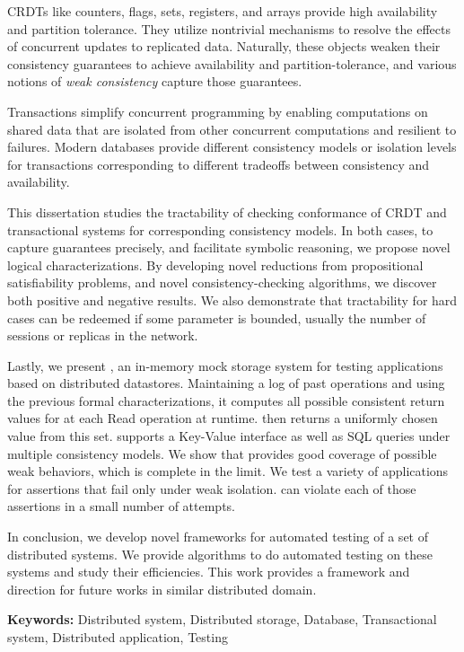CRDTs like counters, flags, sets, registers, and arrays provide high availability and partition tolerance. They utilize nontrivial mechanisms to resolve the effects of concurrent updates to replicated data. Naturally, these objects weaken their consistency guarantees to achieve availability and partition-tolerance, and various notions of \emph{weak consistency} capture those guarantees.

Transactions simplify concurrent programming by enabling computations on shared data that are isolated from other concurrent computations and resilient to failures. Modern databases provide different consistency models or isolation levels for transactions corresponding to different tradeoffs between consistency and availability.

This dissertation studies the tractability of checking conformance of CRDT and transactional systems for corresponding consistency models. In both cases, to capture guarantees precisely, and facilitate symbolic reasoning, we propose novel logical characterizations. By developing novel reductions from propositional satisfiability problems, and novel consistency-checking algorithms, we discover both positive and negative results. We also demonstrate that tractability for hard cases can be redeemed if some parameter is bounded, usually the number of sessions or replicas in the network.

Lastly, we present \tool{}, an in-memory mock storage system for testing applications based on distributed datastores. Maintaining a log of past operations and using the previous formal characterizations, it computes all possible consistent return values for at each \textrm{Read} operation at runtime. \tool{} then returns a uniformly chosen value from this set. \tool{} supports a Key-Value interface as well as SQL queries under multiple consistency models. We show that \tool{} provides good coverage of possible weak behaviors, which is complete in the limit. We test a variety of applications for assertions that fail only under weak isolation. \tool{} can violate each of those assertions in a small number of attempts.

In conclusion, we develop novel frameworks for automated testing of a set of distributed systems. We provide algorithms to do automated testing on these systems and study their efficiencies. This work provides a framework and direction for future works in similar distributed domain. 

\textbf{Keywords:} Distributed system, Distributed storage, Database, Transactional system, Distributed application, Testing
